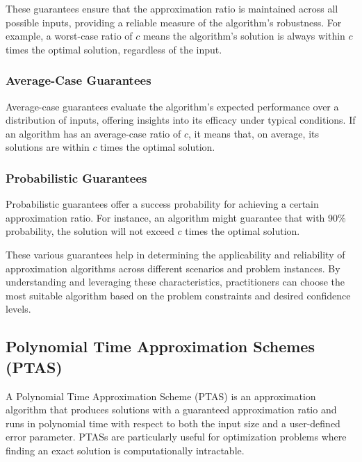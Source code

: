 \documentclass[12pt]{book} %
\begin{document}
These guarantees ensure that the approximation ratio is maintained across all possible inputs, providing a reliable measure of the algorithm's robustness. For example, a worst-case ratio of \(c\) means the algorithm's solution is always within \(c\) times the optimal solution, regardless of the input.

\subsubsection{Average-Case Guarantees}

Average-case guarantees evaluate the algorithm's expected performance over a distribution of inputs, offering insights into its efficacy under typical conditions. If an algorithm has an average-case ratio of \(c\), it means that, on average, its solutions are within \(c\) times the optimal solution.

\subsubsection{Probabilistic Guarantees}

Probabilistic guarantees offer a success probability for achieving a certain approximation ratio. For instance, an algorithm might guarantee that with 90\% probability, the solution will not exceed \(c\) times the optimal solution. 

These various guarantees help in determining the applicability and reliability of approximation algorithms across different scenarios and problem instances. By understanding and leveraging these characteristics, practitioners can choose the most suitable algorithm based on the problem constraints and desired confidence levels.


\subsection{Polynomial Time Approximation Schemes (PTAS)}

A Polynomial Time Approximation Scheme (PTAS) is an approximation algorithm that produces solutions with a guaranteed approximation ratio and runs in polynomial time with respect to both the input size and a user-defined error parameter. PTASs are particularly useful for optimization problems where finding an exact solution is computationally intractable.
\end{document}

